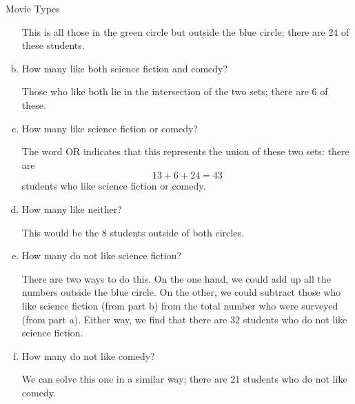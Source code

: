 \begin{example}[https://www.youtube.com/watch?v=Nkay8g-5suM&list=PLfmpjsIzhztuvrh-T2Owgo_gO84qypSBG&index=21]{Movie Types}
\begin{enumerate}[(a)]
This is all those in the green circle but outside the blue circle; there are $\boxed{24}$ of these students.\\

\item How many like both science fiction and comedy?

Those who like both lie in the intersection of the two sets; there are $\boxed{6}$ of these.\\

\item How many like science fiction or comedy?

The word OR indicates that this represents the union of these two sets: there are \[13+6+24 = \boxed{43}\] students who like science fiction or comedy.\\

\item How many like neither?

This would be the $\boxed{8}$ students outside of both circles.\\

\item How many do not like science fiction?

There are two ways to do this.  On the one hand, we could add up all the numbers outside the blue circle.  On the other, we could subtract those who like science fiction (from part b) from the total number who were surveyed (from part a).  Either way, we find that there are $\boxed{32}$ students who do not like science fiction.\\

\item How many do not like comedy?

We can solve this one in a similar way; there are $\boxed{21}$ students who do not like comedy.
\end{enumerate}
\end{example}

